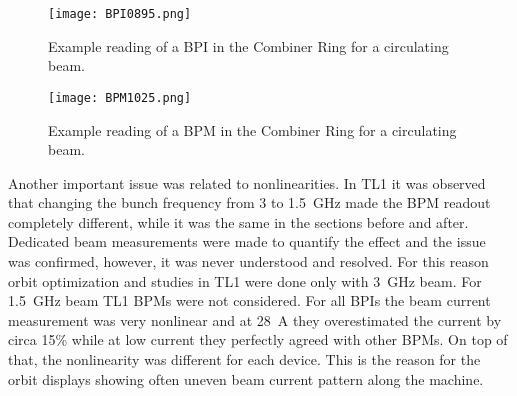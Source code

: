 \begin{figure}
\begin{center}
 \texttt{[image: BPI0895.png]}
 \caption{Example reading of a BPI in the Combiner Ring for a circulating beam.}
\label{fig:bpi_charging_up}
\end{center}
\end{figure}

\begin{figure}
\begin{center}
 \texttt{[image: BPM1025.png]}
 \caption{Example reading of a BPM in the Combiner Ring for a circulating beam.}
\label{fig:bpm_not_charging_up}
\end{center}
\end{figure}


Another important issue was related to nonlinearities. In TL1 it was observed that 
changing the bunch frequency from 3 to 1.5~GHz made the BPM readout completely different, 
while it was the same in the sections before and after. 
Dedicated beam measurements were made to quantify the effect and 
the issue was confirmed, however, it was never understood and resolved. 
For this reason orbit optimization and studies in TL1 were done only with 3~GHz beam.
For 1.5~GHz beam TL1 BPMs were not considered.
For all BPIs the beam current measurement was very nonlinear and 
at 28~A they overestimated the current by 
circa 15\% while at low current they perfectly agreed with other BPMs. 
On top of that, the nonlinearity was different for each device.
This is the reason for the orbit displays showing often uneven beam current pattern along the machine. 



